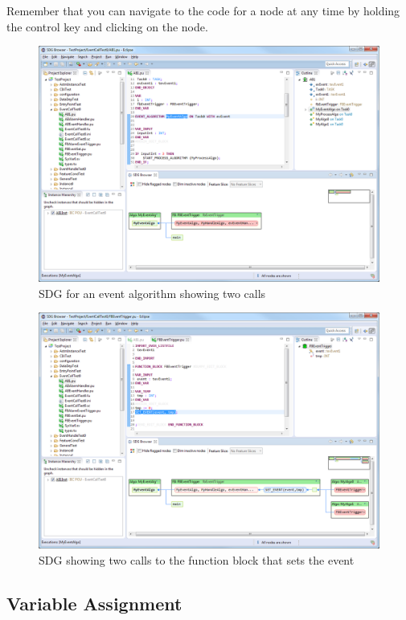 Remember that you can navigate to the code for a node at any time by holding the control key and clicking on the node.

\begin{figure}[p]
  \centering
    \includegraphics[width=\textwidth]{bilder/manual-event1}
  \caption{SDG for an event algorithm showing two calls}
  \label{fig:manual-event1}
\end{figure}

\begin{figure}[p]
  \centering
    \includegraphics[width=\textwidth]{bilder/manual-event2}
  \caption{SDG showing two calls to the function block that sets the event}
  \label{fig:manual-event2}
\end{figure}

\subsection*{Variable Assignment}

